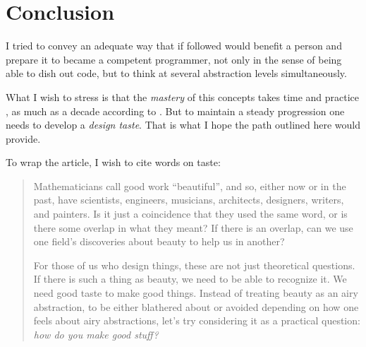 \section{Conclusion}

I tried to convey an adequate way that if followed would benefit a person and
prepare it to became a competent programmer, not only in the sense of being able
to dish out code, but to think at several abstraction levels simultaneously. 

What I wish to stress is that the \emph{mastery} of this concepts takes
time and practice \cite{programming:chamond__sod}, as much as a decade according to
\cite{education:norvig__teach_yourself_programming}. But to maintain a steady
progression one needs to develop a \emph{design taste}. That is what I hope the
path outlined here would provide.

To wrap the article, I wish to cite \cite{education:paul_graham__a_taste_for_makers} words on taste:

\begin{quotation}

    Mathematicians call good work ``beautiful'', and so, either now or in the
    past, have scientists, engineers, musicians, architects, designers, writers,
    and painters. Is it just a coincidence that they used the same word, or is
    there some overlap in what they meant? If there is an overlap, can we use
    one field's discoveries about beauty to help us in another?

    For those of us who design things, these are not just theoretical questions.
    If there is such a thing as beauty, we need to be able to recognize it. We
    need good taste to make good things. Instead of treating beauty as an airy
    abstraction, to be either blathered about or avoided depending on how one
    feels about airy abstractions, let's try considering it as a practical
    question: \emph{how do you make good stuff?}

\end{quotation}
